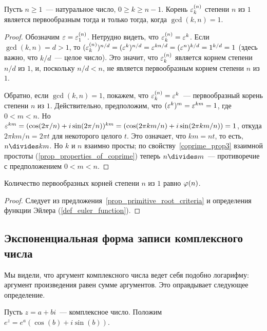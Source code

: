 
\begin{proposition}\label{prop_primitive_root_criteria}
Пусть $n\geq 1$~--- натуральное число, $0\geq k\geq n-1$.
Корень $\varepsilon_k^{(n)}$ степени $n$ из $1$ является первообразным тогда
и только тогда, когда $\gcd(k,n)=1$.
\end{proposition}
\begin{proof}
Обозначим $\varepsilon=\varepsilon_1^{(n)}$. Нетрудно видеть, что $\varepsilon_k^{(n)}=\varepsilon^k$.
Если $\gcd(k,n)=d>1$, то
$(\varepsilon_k^{(n)})^{n/d}=(\varepsilon^k)^{n/d}=\varepsilon^{kn/d}=(\varepsilon^n)^{k/d}=1^{k/d}=1$
(здесь важно, что $k/d$~--- целое число). Это значит, что
$\varepsilon_k^{(n)}$ является корнем степени $n/d$ из $1$, и, поскольку $n/d<n$, не
является первообразным корнем степени $n$ из $1$.

Обратно, если $\gcd(k,n)=1$, покажем, что $\varepsilon_k^{(n)}=\varepsilon^k$~---
первообразный корень степени $n$ из $1$.
Действительно, предположим,
что $(\varepsilon^k)^m=\varepsilon^{km}=1$, где $0<m<n$. Но
$\varepsilon^{km}=(\cos(2\pi/n)+i\sin(2\pi/n))^{km}= (\cos(2\pi
km/n)+i\sin(2\pi km/n))=1$, откуда $2\pi km/n=2\pi t$ для некоторого
целого $t$. Это означает, что $km=nt$, то есть, $n\divides km$. Но
$k$ и $n$ взаимно просты; по свойству~\ref{coprime_prop3} взаимной
простоты (\ref{prop_properties_of_coprime}) теперь
$n\divides m$~--- противоречие с предположением $0<m<n$.
\end{proof}

\begin{corollary}
Количество первообразных корней степени $n$ из $1$ равно $\varphi(n)$.
\end{corollary}
\begin{proof}
Следует из предложения~\ref{prop_primitive_root_criteria} и
определения функции Эйлера (\ref{def_euler_function}).
\end{proof}

\subsection{Экспоненциальная форма записи комплексного числа}


Мы видели, что аргумент комплексного числа ведет себя подобно
логарифму: аргумент произведения равен сумме аргументов. Это
оправдывает следующее определение.
\begin{definition}
Пусть $z=a+bi$~--- комплексное число. Положим
$e^z=e^a(\cos(b)+i\sin(b))$.
\end{definition}

